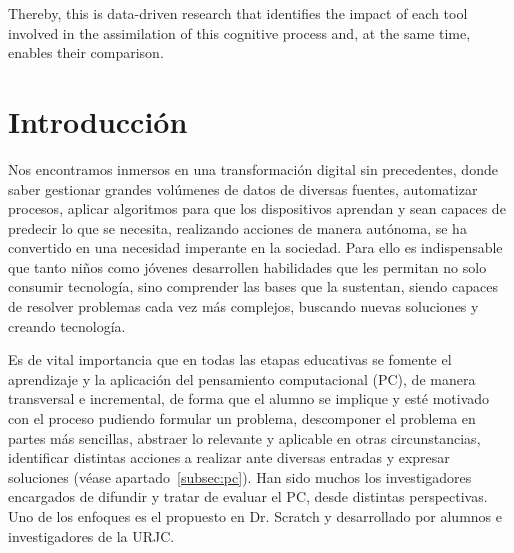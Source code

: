 \documentclass[a4paper, 12pt]{book}
\begin{document}
Thereby, this is data-driven research that identifies the impact of each tool involved in the assimilation
of this cognitive process and, at the same time, enables their comparison.




\tableofcontents 
\listoffigures %
\listoftables %



\cleardoublepage
\chapter{Introducción}
\label{chap:intro} %

Nos encontramos inmersos en una transformación digital sin precedentes, donde saber gestionar grandes volúmenes de datos de diversas fuentes, automatizar procesos, aplicar algoritmos para que los dispositivos aprendan y sean capaces de predecir lo que se necesita, realizando acciones de manera autónoma, se ha convertido en una necesidad imperante en la sociedad. Para ello es indispensable que tanto niños como jóvenes desarrollen habilidades que les permitan no solo consumir tecnología, sino comprender las bases que la sustentan, siendo capaces de resolver problemas cada vez más complejos, buscando nuevas soluciones y creando tecnología.
  
Es de vital importancia que en todas las etapas educativas se fomente el aprendizaje y la aplicación del pensamiento computacional (PC), 
de manera transversal e incremental, de forma que el alumno se implique y esté motivado con el proceso pudiendo formular un problema, descomponer el problema en partes más sencillas, abstraer lo relevante y aplicable en otras circunstancias, identificar distintas acciones a realizar ante diversas entradas y expresar soluciones (véase apartado~\ref{subsec:pc}). Han sido muchos los investigadores encargados de difundir y tratar de evaluar el PC, desde distintas perspectivas. Uno de los enfoques es el propuesto en Dr. Scratch y desarrollado por alumnos e investigadores de la URJC.
\end{document}
